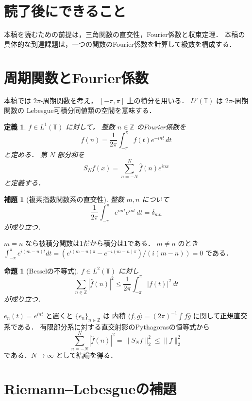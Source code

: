\documentclass[a5paper,10pt,onecolumn]{jsarticle}
\makeatletter
\theoremstyle{mathnotetheorem}
\newtheorem{definition}[theorem]{定義}
\newtheorem{lemma}[theorem]{補題}
\newtheorem{proposition}[theorem]{命題}
\renewcommand{\proofname}{証明}
\renewenvironment{proof}[1][\proofname]{%
  \par\pushQED{\qed}\normalfont\topsep4\p@\@plus2\p@\relax
  \trivlist\item[\hskip\labelsep\bfseries #1]\ignorespaces
}{\popQED\endtrivlist\@endpefalse}
\newcommand{\norm}[1]{\lVert #1\rVert}
\makeatother
\begin{document}
\section*{読了後にできること}
本稿を読むための前提は，三角関数の直交性，Fourier係数と収束定理．
本稿の具体的な到達課題は，一つの関数のFourier係数を計算して級数を構成する．

\section{周期関数とFourier係数}

本稿では $2\pi$-周期関数を考え，
$[-\pi,\pi]$ 上の積分を用いる．
$L^p(\mathbb T)$ は $2\pi$-周期関数の
Lebesgue可積分同値類の空間を意味する．

\begin{definition}
$f\in L^1(\mathbb T)$ に対して，
整数 $n\in\mathbb Z$ のFourier係数を
\[
 \widehat f(n)=\frac1{2\pi}
 \int_{-\pi}^\pi f(t)e^{-int}\,dt
\]
と定める．
第 $N$ 部分和を
\[
 S_Nf(x)=\sum_{n=-N}^N\widehat f(n)e^{inx}
\]
と定義する．
\end{definition}

\begin{lemma}[複素指数関数系の直交性]\label{lem:orthogonal}
整数 $m,n$ について
\[
 \frac1{2\pi}\int_{-\pi}^\pi e^{imt}\overline{e^{int}}\,dt
 =\delta_{mn}
\]
が成り立つ．
\end{lemma}
\begin{proof}
$m=n$ なら被積分関数は1だから積分は1である．
$m\ne n$ のとき
$\int_{-\pi}^\pi e^{i(m-n)t}dt
 =(e^{i(m-n)\pi}-e^{-i(m-n)\pi})/(i(m-n))=0$
である．
\end{proof}

\begin{proposition}[Besselの不等式]\label{prop:bessel}
$f\in L^2(\mathbb T)$ に対し
\[
 \sum_{n\in\mathbb Z}|\widehat f(n)|^2
 \le\frac1{2\pi}\int_{-\pi}^\pi|f(t)|^2\,dt
\]
が成り立つ．
\end{proposition}
\begin{proof}
$e_n(t)=e^{int}$ と置くと
$\{e_n\}_{n\in\mathbb Z}$ は
内積 $\langle f,g\rangle
 =(2\pi)^{-1}\int f\bar g$ に関して正規直交系である．
有限部分系に対する直交射影のPythagorasの恒等式から
\[
 \sum_{n=-N}^N|\widehat f(n)|^2
 =\norm{S_Nf}_2^2\le\norm f_2^2
\]
である．$N\to\infty$ として結論を得る．
\end{proof}

\section{Riemann--Lebesgueの補題}
\end{document}
